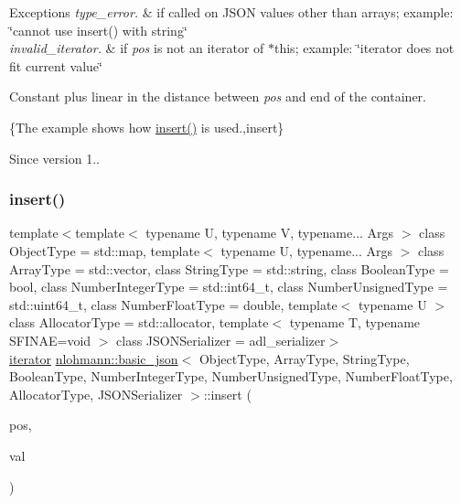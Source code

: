 \begin{DoxyExceptions}{Exceptions}
{\em type\+\_\+error.} & if called on J\+S\+ON values other than arrays; example\+: {\ttfamily \char`\"{}cannot use insert() with string\char`\"{}} \\
\hline
{\em invalid\+\_\+iterator.} & if {\itshape pos} is not an iterator of $\ast$this; example\+: {\ttfamily \char`\"{}iterator does not fit current value\char`\"{}}\\
\hline
\end{DoxyExceptions}
Constant plus linear in the distance between {\itshape pos} and end of the container.

\{The example shows how {\ttfamily \mbox{\hyperlink{classnlohmann_1_1basic__json_a0136728f5db69d4051c77b94307abd6c}{insert()}}} is used.,insert\}

\begin{DoxySince}{Since}
version 1.. 
\end{DoxySince}
\mbox{\label{classnlohmann_1_1basic__json_a1ecce113ff11dd294689ee4d45cbb855}} 
\subsubsection{\texorpdfstring{insert()}{insert()}\hspace{0.1cm}{\footnotesize\ttfamily [2/6]}}
{\footnotesize\ttfamily template$<$template$<$ typename U, typename V, typename... Args $>$ class Object\+Type = std\+::map, template$<$ typename U, typename... Args $>$ class Array\+Type = std\+::vector, class String\+Type  = std\+::string, class Boolean\+Type  = bool, class Number\+Integer\+Type  = std\+::int64\+\_\+t, class Number\+Unsigned\+Type  = std\+::uint64\+\_\+t, class Number\+Float\+Type  = double, template$<$ typename U $>$ class Allocator\+Type = std\+::allocator, template$<$ typename T, typename S\+F\+I\+N\+A\+E=void $>$ class J\+S\+O\+N\+Serializer = adl\+\_\+serializer$>$ \\
\mbox{\hyperlink{classnlohmann_1_1basic__json_a099316232c76c034030a38faa6e34dca}{iterator}} \mbox{\hyperlink{classnlohmann_1_1basic__json}{nlohmann\+::basic\+\_\+json}}$<$ Object\+Type, Array\+Type, String\+Type, Boolean\+Type, Number\+Integer\+Type, Number\+Unsigned\+Type, Number\+Float\+Type, Allocator\+Type, J\+S\+O\+N\+Serializer $>$\+::insert (\begin{DoxyParamCaption}\item[{\mbox{\hyperlink{classnlohmann_1_1basic__json_a41a70cf9993951836d129bb1c2b3126a}{const\+\_\+iterator}}}]{pos,  }\item[{\mbox{\hyperlink{classnlohmann_1_1basic__json}{basic\+\_\+json}}$<$ Object\+Type, Array\+Type, String\+Type, Boolean\+Type, Number\+Integer\+Type, Number\+Unsigned\+Type, Number\+Float\+Type, Allocator\+Type, J\+S\+O\+N\+Serializer $>$ \&\&}]{val }\end{DoxyParamCaption})\hspace{0.3cm}{\ttfamily [inline]}}



